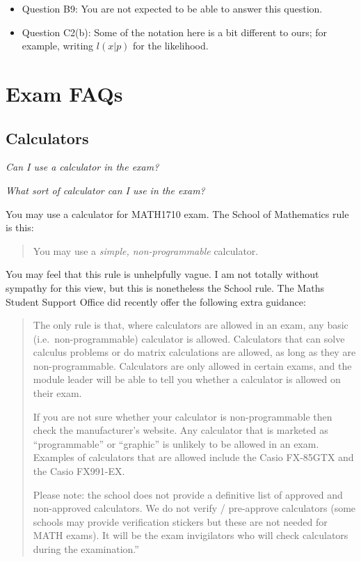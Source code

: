 \documentclass[
  letterpaper,
]{report}
\providecommand{\tightlist}{%
  \setlength{\itemsep}{0pt}\setlength{\parskip}{0pt}}\usepackage{longtable,booktabs,array}
\theoremstyle{definition}
\theoremstyle{definition}
\theoremstyle{remark}
\begin{document}
\begin{itemize}
  \begin{itemize}
  \tightlist
  \item
    Question B9: You are not expected to be able to answer this
    question.
  \item
    Question C2(b): Some of the notation here is a bit different to
    ours; for example, writing \(l(x|p)\) for the likelihood.
  \end{itemize}
\end{itemize}

\hypertarget{exam-faqs}{%
\section{Exam FAQs}\label{exam-faqs}}

\hypertarget{calculators}{%
\subsection{Calculators}\label{calculators}}

\emph{Can I use a calculator in the exam?}

\emph{What sort of calculator can I use in the exam?}

You may use a calculator for MATH1710 exam. The School of Mathematics
rule is this:

\begin{quote}
You may use a \emph{simple, non-programmable} calculator.
\end{quote}

You may feel that this rule is unhelpfully vague. I am not totally
without sympathy for this view, but this is nonetheless the School rule.
The Maths Student Support Office did recently offer the following extra
guidance:

\begin{quote}
The only rule is that, where calculators are allowed in an exam, any
basic (i.e.~non-programmable) calculator is allowed. Calculators that
can solve calculus problems or do matrix calculations are allowed, as
long as they are non-programmable. Calculators are only allowed in
certain exams, and the module leader will be able to tell you whether a
calculator is allowed on their exam.

If you are not sure whether your calculator is non-programmable then
check the manufacturer's website. Any calculator that is marketed as
``programmable'' or ``graphic'' is unlikely to be allowed in an exam.
Examples of calculators that are allowed include the Casio FX-85GTX and
the Casio FX991-EX.

Please note: the school does not provide a definitive list of approved
and non-approved calculators. We do not verify / pre-approve calculators
(some schools may provide verification stickers but these are not needed
for MATH exams). It will be the exam invigilators who will check
calculators during the examination.''
\end{quote}
\end{document}
